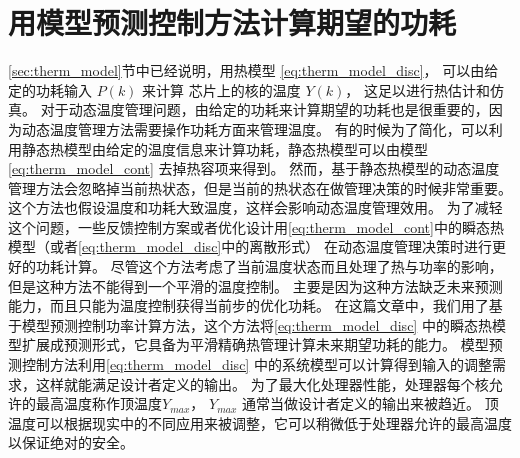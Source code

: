 \section{用模型预测控制方法计算期望的功耗}\label{sec:mpc}
\ref{sec:therm_model}节中已经说明，用热模型 \eqref{eq:therm_model_disc}， 可以由给定的功耗输入 $P(k)$ 来计算
芯片上的核的温度 $Y(k)$， 这足以进行热估计和仿真。
对于动态温度管理问题，由给定的功耗来计算期望的功耗也是很重要的，因为动态温度管理方法需要操作功耗方面来管理温度。
有的时候为了简化，可以利用静态热模型由给定的温度信息来计算功耗，静态热模型可以由模型 \eqref{eq:therm_model_cont} 去掉热容项来得到。
然而，基于静态热模型的动态温度管理方法会忽略掉当前热状态，但是当前的热状态在做管理决策的时候非常重要。
这个方法也假设温度和功耗大致温度，这样会影响动态温度管理效用。
为了减轻这个问题，一些反馈控制方案或者优化设计用\eqref{eq:therm_model_cont}中的瞬态热模型（或者\eqref{eq:therm_model_disc}中的离散形式）
在动态温度管理决策时进行更好的功耗计算。
尽管这个方法考虑了当前温度状态而且处理了热与功率的影响，但是这种方法不能得到一个平滑的温度控制。
主要是因为这种方法缺乏未来预测能力，而且只能为温度控制获得当前步的优化功耗。
在这篇文章中，我们用了基于模型预测控制功率计算方法，这个方法将\eqref{eq:therm_model_disc} 中的瞬态热模型扩展成预测形式，它具备为平滑精确热管理计算未来期望功耗的能力。
模型预测控制方法利用\eqref{eq:therm_model_disc} 中的系统模型可以计算得到输入的调整需求，这样就能满足设计者定义的输出。
为了最大化处理器性能，处理器每个核允许的最高温度称作顶温度$Y_{max}$， $Y_{max}$ 通常当做设计者定义的输出来被趋近。
顶温度可以根据现实中的不同应用来被调整，它可以稍微低于处理器允许的最高温度以保证绝对的安全。


